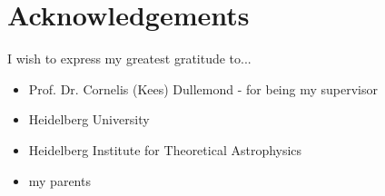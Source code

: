 \chapter*{Acknowledgements}

\thispagestyle{NoHeader}

I wish to express my greatest gratitude to...
\begin{itemize}
    \item Prof. Dr. Cornelis (Kees) Dullemond
        - for being my supervisor
    \item Heidelberg University
    \item Heidelberg Institute for Theoretical Astrophysics
    \item my parents 
\end{itemize}
